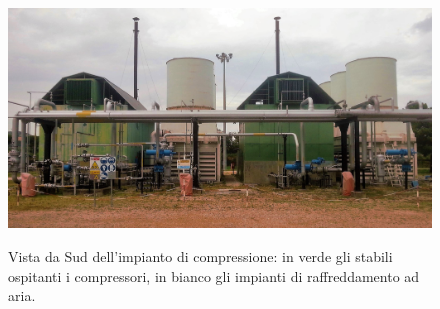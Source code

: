 \begin{figure}[htbp] %
    \centering
    \includegraphics[width=.8\textwidth]{fig/test/centrale/compressori2.jpg} \label{fig:compressionegenerale}
    \caption{Vista da Sud dell'impianto di compressione: in verde gli stabili ospitanti i compressori, in bianco gli impianti di raffreddamento ad aria.} 
    \label{fig:centrale-compressione}
\end{figure}



